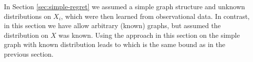 In Section \ref{sec:simple-regret} we assumed a simple graph structure and unknown distributions on $X_i$, which were then learned from observational
data. In contrast, in this section we have allow arbitrary (known) graphs, but assumed the distribution on $X$ was known. 
Using the approach in this section on the simple graph with known distribution leads to 
which is the same bound as in the previous section. 





